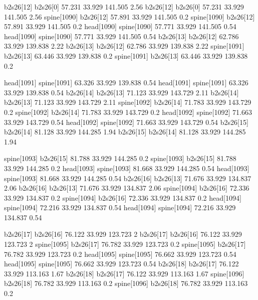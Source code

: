 b2s26[12]    b2s26[0]    57.231    33.929    141.505    2.56
b2s26[12]    b2s26[0]    57.231    33.929    141.505    2.56
spine[1090]    b2s26[12]    57.891    33.929    141.505    0.2
spine[1090]    b2s26[12]    57.891    33.929    141.505    0.2
head[1090]    spine[1090]    57.771    33.929    141.505    0.54
head[1090]    spine[1090]    57.771    33.929    141.505    0.54
b2s26[13]    b2s26[12]    62.786    33.929    139.838    2.22
b2s26[13]    b2s26[12]    62.786    33.929    139.838    2.22
spine[1091]    b2s26[13]    63.446    33.929    139.838    0.2
spine[1091]    b2s26[13]    63.446    33.929    139.838    0.2


head[1091]    spine[1091]    63.326    33.929    139.838    0.54
head[1091]    spine[1091]    63.326    33.929    139.838    0.54
b2s26[14]    b2s26[13]    71.123    33.929    143.729    2.11
b2s26[14]    b2s26[13]    71.123    33.929    143.729    2.11
spine[1092]    b2s26[14]    71.783    33.929    143.729    0.2
spine[1092]    b2s26[14]    71.783    33.929    143.729    0.2
head[1092]    spine[1092]    71.663    33.929    143.729    0.54
head[1092]    spine[1092]    71.663    33.929    143.729    0.54
b2s26[15]    b2s26[14]    81.128    33.929    144.285    1.94
b2s26[15]    b2s26[14]    81.128    33.929    144.285    1.94


spine[1093]    b2s26[15]    81.788    33.929    144.285    0.2
spine[1093]    b2s26[15]    81.788    33.929    144.285    0.2
head[1093]    spine[1093]    81.668    33.929    144.285    0.54
head[1093]    spine[1093]    81.668    33.929    144.285    0.54
b2s26[16]    b2s26[13]    71.676    33.929    134.837    2.06
b2s26[16]    b2s26[13]    71.676    33.929    134.837    2.06
spine[1094]    b2s26[16]    72.336    33.929    134.837    0.2
spine[1094]    b2s26[16]    72.336    33.929    134.837    0.2
head[1094]    spine[1094]    72.216    33.929    134.837    0.54
head[1094]    spine[1094]    72.216    33.929    134.837    0.54


b2s26[17]    b2s26[16]    76.122    33.929    123.723    2
b2s26[17]    b2s26[16]    76.122    33.929    123.723    2
spine[1095]    b2s26[17]    76.782    33.929    123.723    0.2
spine[1095]    b2s26[17]    76.782    33.929    123.723    0.2
head[1095]    spine[1095]    76.662    33.929    123.723    0.54
head[1095]    spine[1095]    76.662    33.929    123.723    0.54
b2s26[18]    b2s26[17]    76.122    33.929    113.163    1.67
b2s26[18]    b2s26[17]    76.122    33.929    113.163    1.67
spine[1096]    b2s26[18]    76.782    33.929    113.163    0.2
spine[1096]    b2s26[18]    76.782    33.929    113.163    0.2


